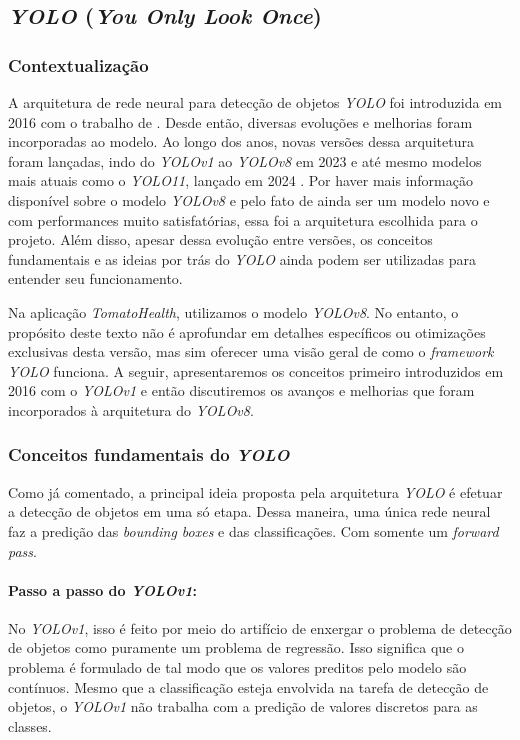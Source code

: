 \subsection{\emph{YOLO} (\emph{You Only Look Once}) \label{sec:yolo}}
\label{sec:modelo}
\subsubsection{Contextualização}
A arquitetura de rede neural para detecção de objetos \emph{YOLO} foi introduzida em 2016 com o trabalho de \cite{yolo}. Desde então, diversas evoluções e melhorias foram incorporadas ao modelo. Ao longo dos anos, novas versões dessa arquitetura foram lançadas, indo do \emph{YOLOv1} ao \emph{YOLOv8} em 2023 e até mesmo modelos mais atuais como o \emph{YOLO11}, lançado em 2024 \citep{yolo, yolov8_2023, yolo11_2024}. Por haver mais informação disponível sobre o modelo \emph{YOLOv8} e pelo fato de ainda ser um modelo novo e com performances muito satisfatórias, essa foi a arquitetura escolhida para o projeto. Além disso, apesar dessa evolução entre versões, os conceitos fundamentais e as ideias por trás do \emph{YOLO} ainda podem ser utilizadas para entender seu funcionamento.


Na aplicação \emph{TomatoHealth}, utilizamos o modelo \emph{YOLOv8}. No entanto, o propósito deste texto não é aprofundar em detalhes específicos ou otimizações exclusivas desta versão, mas sim oferecer uma visão geral de como o \emph{framework YOLO} funciona. A seguir, apresentaremos os conceitos primeiro introduzidos em 2016 com o \emph{YOLOv1} e então discutiremos os avanços e melhorias que foram incorporados à arquitetura do \emph{YOLOv8}.

\subsubsection{Conceitos fundamentais do \emph{YOLO}}
Como já comentado, a principal ideia proposta pela arquitetura \emph{YOLO} é efetuar a detecção de objetos em uma só etapa. Dessa maneira, uma única rede neural faz a predição das \emph{bounding boxes} e das classificações. Com somente um \emph{forward pass}.

\paragraph{Passo a passo do \emph{YOLOv1}:}
No \emph{YOLOv1}, isso é feito por meio do artifício de enxergar o problema de detecção de objetos como puramente um problema de regressão. Isso significa que o problema é formulado de tal modo que os valores preditos pelo modelo são contínuos. Mesmo que a classificação esteja envolvida na tarefa de detecção de objetos, o \emph{YOLOv1} não trabalha com a predição de valores discretos para as classes.

